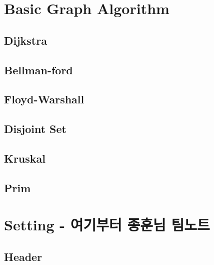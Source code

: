 \documentclass[10pt,landscape,a4paper,twocolumn]{article}
\begin{document}
\newpage

\section{Basic Graph Algorithm}

\subsection{Dijkstra}

\newpage 

\subsection{Bellman-ford}


\subsection{Floyd-Warshall}

\newpage

\subsection{Disjoint Set}



\subsection{Kruskal}


\vfill
\newpage

\subsection{Prim}


\vfill
\newpage

\section{Setting - 여기부터 종훈님 팀노트}
\subsection{Header}


%
%
%
\end{document}
